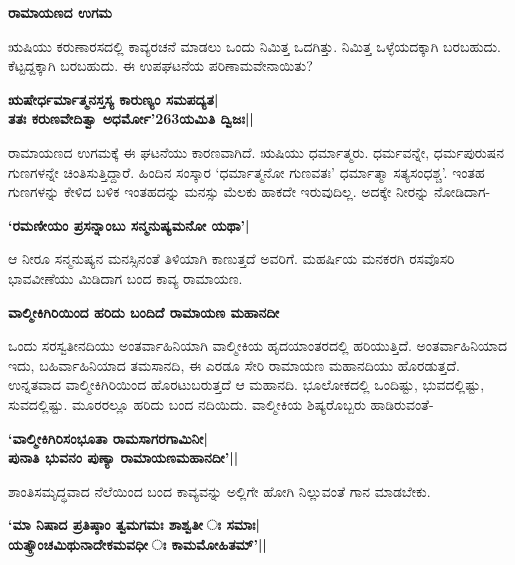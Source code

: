{\bf ರಾಮಾಯಣದ ಉಗಮ} 


ಋಷಿಯು ಕರುಣಾರಸದಲ್ಲಿ ಕಾವ್ಯರಚನೆ ಮಾಡಲು ಒಂದು ನಿಮಿತ್ತ ಒದಗಿತ್ತು. ನಿಮಿತ್ತ ಒಳ್ಳೆಯದಕ್ಕಾಗಿ ಬರಬಹುದು. ಕೆಟ್ಟದ್ದಕ್ಕಾಗಿ ಬರಬಹುದು. ಈ ಉಪಘಟನೆಯ ಪರಿಣಾಮವೇನಾಯಿತು? 


\begin{center} 

{\bf ಋಷೇರ್ಧರ್ಮಾತ್ಮನಸ್ತಸ್ಯ ಕಾರುಣ್ಯಂ ಸಮಪದ್ಯತ|\\ 

ತತಃ ಕರುಣವೇದಿತ್ವಾ ಅಧರ್ಮೋ\char'263ಯಮಿತಿ ದ್ವಿಜಃ||} 

\end{center} 


ರಾಮಾಯಣದ ಉಗಮಕ್ಕೆ ಈ ಘಟನೆಯು ಕಾರಣವಾಗಿದೆ. ಋಷಿಯು ಧರ್ಮಾತ್ಮರು. ಧರ್ಮವನ್ನೇ, ಧರ್ಮಪುರುಷನ ಗುಣಗಳನ್ನೇ ಚಿಂತಿಸುತ್ತಿದ್ದಾರೆ. ಹಿಂದಿನ ಸಂಸ್ಕಾರ `ಧರ್ಮಾತ್ಮನೋ ಗುಣವತಃ' ಧರ್ಮಾತ್ಮಾ ಸತ್ಯಸಂಧಶ್ಚ'. ಇಂತಹ ಗುಣಗಳನ್ನು ಕೇಳಿದ ಬಳಿಕ ಇಂತಹದನ್ನು ಮನಸ್ಸು ಮೆಲಕು ಹಾಕದೇ ಇರುವುದಿಲ್ಲ. ಅದಕ್ಕೇ ನೀರನ್ನು ನೋಡಿದಾಗ- 


\begin{center} 

{\bf `ರಮಣೀಯಂ ಪ್ರಸನ್ನಾಂಬು ಸನ್ಮನುಷ್ಯಮನೋ ಯಥಾ'|} 

\end{center} 


ಆ ನೀರೂ ಸನ್ಮನುಷ್ಯನ ಮನಸ್ಸಿನಂತೆ ತಿಳಿಯಾಗಿ ಕಾಣುತ್ತದೆ ಅವರಿಗೆ. ಮಹರ್ಷಿಯ ಮನಕರಗಿ ರಸವೊಸರಿ ಭಾವವೀಣೆಯು ಮಿಡಿದಾಗ ಬಂದ ಕಾವ್ಯ ರಾಮಾಯಣ. 


{\bf ವಾಲ್ಮೀಕಿಗಿರಿಯಿಂದ ಹರಿದು ಬಂದಿದೆ ರಾಮಾಯಣ ಮಹಾನದೀ} 


ಒಂದು ಸರಸ್ವತೀನದಿಯು ಅಂತರ್ವಾಹಿನಿಯಾಗಿ ವಾಲ್ಮೀಕಿಯ ಹೃದಯಾಂತರದಲ್ಲಿ ಹರಿಯುತ್ತಿದೆ. ಅಂತರ್ವಾಹಿನಿಯಾದ ಇದು, ಬಹಿರ್ವಾಹಿನಿಯಾದ ತಮಸಾನದಿ, ಈ ಎರಡೂ ಸೇರಿ ರಾಮಾಯಣ ಮಹಾನದಿಯು ಹೊರಡುತ್ತದೆ. ಉನ್ನತವಾದ ವಾಲ್ಮೀಕಿಗಿರಿಯಿಂದ ಹೊರಟುಬರುತ್ತದೆ ಆ ಮಹಾನದಿ. ಭೂಲೋಕದಲ್ಲಿ ಒಂದಿಷ್ಟು, ಭುವದಲ್ಲಿಷ್ಟು, ಸುವದಲ್ಲಿಷ್ಟು. ಮೂರರಲ್ಲೂ ಹರಿದು ಬಂದ ನದಿಯಿದು. ವಾಲ್ಮೀಕಿಯ ಶಿಷ್ಯರೊಬ್ಬರು ಹಾಡಿರುವಂತೆ- 


\begin{center} 

{\bf `ವಾಲ್ಮೀಕಿಗಿರಿಸಂಭೂತಾ ರಾಮಸಾಗರಗಾಮಿನೀ|\\ 

ಪುನಾತಿ ಭುವನಂ ಪುಣ್ಯಾ ರಾಮಾಯಣಮಹಾನದೀ'||} 

\end{center} 


ಶಾಂತಿಸಮೃದ್ಧವಾದ ನೆಲೆಯಿಂದ ಬಂದ ಕಾವ್ಯವನ್ನು ಅಲ್ಲಿಗೇ ಹೋಗಿ ನಿಲ್ಲುವಂತೆ ಗಾನ ಮಾಡಬೇಕು. 


\begin{center} 

{\bf `ಮಾ ನಿಷಾದ ಪ್ರತಿಷ್ಠಾಂ ತ್ವಮಗಮಃ ಶಾಶ್ವತೀ ಃ ಸಮಾಃ|\\ 

ಯತ್ಕ್ರೌಂಚಮಿಥುನಾದೇಕಮವಧೀ ಃ ಕಾಮಮೋಹಿತಮ್‍'||} 

\end{center} 


